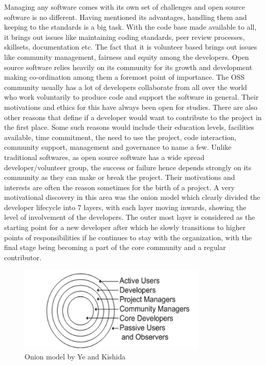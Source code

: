 \documentclass[seploa]{beavtex}
\begin{document}
Managing any software comes with its own set of challenges and open source software is no different. Having mentioned its advantages, handling them and keeping to the standards is a big task. With the code base made available to all, it brings out issues like maintaining coding standards, peer review processes, skillsets, documentation etc\cite{tum2005}. The fact that it is volunteer based brings out issues like community management, fairness and equity among the developers. Open source software relies heavily on its community for its growth and development\cite{seth2010} making co-ordination among them a foremost point of importance. The OSS community usually has a lot of developers collaborate from all over the world who work voluntarily to produce code and support the software in general. Their motivations and ethics for this have always been open for studies\cite{greg2002}. There are also other reasons that define if a developer would want to contribute to the project in the first place. Some such reasons would include their education levels, facilities available, time commitment, the need to use the project, code interaction, community support, management and governance to name a few\cite{chawn2012}. Unlike traditional softwares, as open source software has a wide spread developer/volunteer group, the success or failure hence depends strongly on its community as they can make or break the project. Their motivations and interests are often the reason sometimes for the birth of a project. A very motivational discovery in this area was the onion model which clearly divided the developer lifecycle into 7 layers, with each layer moving inwards, showing the level of involvement of the developers. The outer most layer is considered as the starting point for a new developer after which he slowly transitions to higher points of responsibilities if he continues to stay with the organization, with the final stage being becoming a part of the core community and a regular contributor\cite{kishida2003}.

\begin{figure}[H]
\centering
\includegraphics[width=90mm]{onion.png}
\caption{Onion model by Ye and Kishida}
\end{figure}
\end{document}
